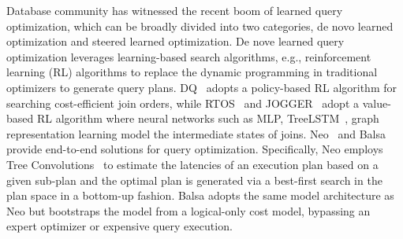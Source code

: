  Database community has witnessed the recent boom of learned query optimization, which can be broadly divided into two categories, de novo learned optimization and steered learned optimization.
De nove learned query optimization leverages learning-based search algorithms, e.g., reinforcement learning (RL) algorithms to replace the dynamic programming in traditional optimizers to generate query plans.
DQ~\cite{DBLP:journals/corr/abs-1808-03196} adopts a policy-based RL algorithm for searching cost-efficient join orders, while RTOS~\cite{DBLP:conf/icde/Yu0C020} and JOGGER~\cite{DBLP:conf/kdd/0008Y000CZ022} adopt a value-based RL algorithm where neural networks such as MLP, TreeLSTM~\cite{DBLP:conf/acl/TaiSM15}, graph representation learning model the intermediate states of joins. 
Neo~\cite{DBLP:journals/pvldb/MarcusNMZAKPT19} and Balsa~\cite{DBLP:conf/sigmod/YangC0MLS22} provide end-to-end solutions for query optimization.
Specifically, 
Neo employs Tree Convolutions~\cite{DBLP:conf/aaai/MouLZWJ16} to estimate the latencies of an execution plan based on a given sub-plan and the optimal plan is generated via a best-first search in the plan space in a bottom-up fashion.
Balsa adopts the same model architecture as Neo but bootstraps the model from a logical-only cost model, bypassing an expert optimizer or expensive query execution.

